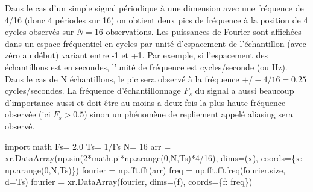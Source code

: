 \documentclass[
  french,
  11pt,
  letterpaper,
  open=any,
  twoside=false,
  french]{scrbook}
\newenvironment{Shaded}{\begin{snugshade}}{\end{snugshade}}
\newcommand{\DecValTok}[1]{\textcolor[rgb]{0.68,0.00,0.00}{#1}}
\newcommand{\FloatTok}[1]{\textcolor[rgb]{0.68,0.00,0.00}{#1}}
\newcommand{\ImportTok}[1]{\textcolor[rgb]{0.00,0.46,0.62}{#1}}
\newcommand{\NormalTok}[1]{\textcolor[rgb]{0.00,0.23,0.31}{#1}}
\newcommand{\OperatorTok}[1]{\textcolor[rgb]{0.37,0.37,0.37}{#1}}
\newcommand{\StringTok}[1]{\textcolor[rgb]{0.13,0.47,0.30}{#1}}
\begin{document}
Dans le cas d'un simple signal périodique à une dimension avec une
fréquence de 4/16 (donc 4 périodes sur 16) on obtient deux pics de
fréquence à la position de 4 cycles observés sur \(N=16\) observations.
Les puissances de Fourier sont affichées dans un espace fréquentiel en
cycles par unité d'espacement de l'échantillon (avec zéro au début)
variant entre -1 et +1. Par exemple, si l'espacement des échantillons
est en secondes, l'unité de fréquence est cycles/seconde (ou Hz). Dans
le cas de N échantillons, le pic sera observé à la fréquence
\(+/- 4/16=0.25\) cycles/secondes. La fréquence d'échantillonnage
\(F_s\) du signal a aussi beaucoup d'importance aussi et doit être au
moins a deux fois la plus haute fréquence observée (ici \(F_s > 0.5\))
sinon un phénomène de repliement appelé aliasing sera observé.

\begin{Shaded}
\begin{Highlighting}[]
\ImportTok{import}\NormalTok{ math}
\NormalTok{Fs}\OperatorTok{=} \FloatTok{2.0}
\NormalTok{Ts}\OperatorTok{=} \DecValTok{1}\OperatorTok{/}\NormalTok{Fs}
\NormalTok{N}\OperatorTok{=} \DecValTok{16}
\NormalTok{arr }\OperatorTok{=}\NormalTok{ xr.DataArray(np.sin(}\DecValTok{2}\OperatorTok{*}\NormalTok{math.pi}\OperatorTok{*}\NormalTok{np.arange(}\DecValTok{0}\NormalTok{,N,Ts)}\OperatorTok{*}\DecValTok{4}\OperatorTok{/}\DecValTok{16}\NormalTok{),}
\NormalTok{                   dims}\OperatorTok{=}\NormalTok{(}\StringTok{\textquotesingle{}x\textquotesingle{}}\NormalTok{), coords}\OperatorTok{=}\NormalTok{\{}\StringTok{\textquotesingle{}x\textquotesingle{}}\NormalTok{: np.arange(}\DecValTok{0}\NormalTok{,N,Ts)\})}
\NormalTok{fourier }\OperatorTok{=}\NormalTok{ np.fft.fft(arr)}
\NormalTok{freq }\OperatorTok{=}\NormalTok{ np.fft.fftfreq(fourier.size, d}\OperatorTok{=}\NormalTok{Ts)}
\NormalTok{fourier }\OperatorTok{=}\NormalTok{ xr.DataArray(fourier,}
\NormalTok{                   dims}\OperatorTok{=}\NormalTok{(}\StringTok{\textquotesingle{}f\textquotesingle{}}\NormalTok{), coords}\OperatorTok{=}\NormalTok{\{}\StringTok{\textquotesingle{}f\textquotesingle{}}\NormalTok{: freq\})}


\end{Highlighting}
\end{Shaded}
\end{document}
